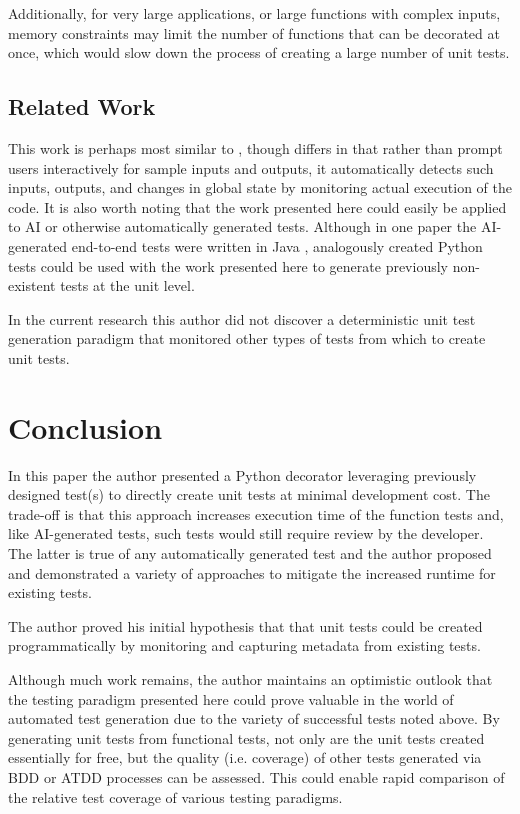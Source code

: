 \documentclass[10pt, conference]{IEEEtran}
\begin{document}
Additionally, for very large applications, or large
functions with complex inputs, memory constraints may 
limit the number of functions that can be decorated at once,
which would slow down the process of creating 
a large number of unit tests.

\subsection{Related Work}\label{sec:related-work}
This work is perhaps most similar to 
\cite{lahiri2023interactivecodegenerationtestdriven}, though
differs in that rather than prompt users interactively for sample inputs and
outputs, it automatically detects such inputs, outputs, and changes in global
state by monitoring actual execution of the code.  It is also worth noting 
that the work presented here could easily be applied to AI or otherwise 
automatically generated tests.  Although in one paper the AI-generated end-to-end tests 
were written in Java \cite{leotta2024ai}, analogously created Python tests could
be used with the work presented here to generate previously non-existent 
tests at the unit level.

In the current research this author did not discover a deterministic 
unit test generation paradigm that monitored other types of
tests from which to create unit tests.

%
\section{Conclusion}\label{sec:conclusion}
In this paper the author presented
a Python decorator leveraging previously designed test(s) to directly create 
unit tests at minimal development cost.
The trade-off is that this approach increases execution time of the function 
tests and, like AI-generated tests, such tests would still require review by the 
developer. The latter is true of any automatically generated test and 
the author proposed and demonstrated a variety of approaches to 
mitigate the increased runtime for existing tests.

The author proved his initial hypothesis that 
that unit tests could be
created programmatically by monitoring and capturing 
metadata from existing tests.

Although much work remains, the author maintains an optimistic outlook
that the testing paradigm presented here could prove valuable in the 
world of automated test generation due to the variety of successful 
tests noted above.  By generating unit tests from functional tests, 
not only are the unit tests created essentially for free,
but the quality (i.e. coverage) of other tests generated via BDD or ATDD 
processes can be assessed. This could enable rapid comparison
of the relative test coverage of various testing paradigms.
\end{document}
